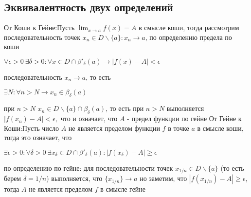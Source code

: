 \documentclass[12pt]{article}
\begin{document}
\subsection{Эквивалентность двух определений}
От Коши к Гейне:\newline Пусть $\lim_{x\to a}f(x) = A$ в смысле коши, тогда рассмотрим последовательность точек $x_n \in D \backslash \{a\}: x_n \to a$, по определению предела по коши 
\begin{center}
$\forall \epsilon > 0 \ \exists \delta > 0: \forall x \in D \cap \beta'_{\delta}(a) \to |f(x) - A | < \epsilon$
\end{center}
последовательность $x_n \to a$, то есть 
\begin{center}
$\exists N: \forall n > N \to x_n \in \beta_{\delta}(a)$    
\end{center}
при $n > N$ $x_n \in D \backslash \{a\} \cap \beta_{\delta}(a)$, то есть при $n > N$ выполняется $
|f(x_n) - A| < \epsilon, $ что и означает, что $A$ - предел функции по гейне\newline
От Гейне к Коши:\newline Пусть число $A$ не является пределом функции $f$ в точке $a$ в смысле коши, тогда это означает, что
\begin{center}
$\exists \epsilon > 0: \forall \delta > 0 \ \exists x_{\delta} \in D \cap \beta'_{\delta}(a): |f(x_{\delta}) - A| \geq \epsilon$
\end{center}
по определению  по гейне: для последовательности точек $ x_{1/n} \in D \backslash \{a\} $ (то есть берем $\delta = 1/n$) выполняется, что $\{x_{1/n}\} \to a$ но заметим, что $|f(x_{1/n}) - A| \geq \epsilon $, тогда $A$ не является пределом $f$ в смысле гейне
\end{document}
